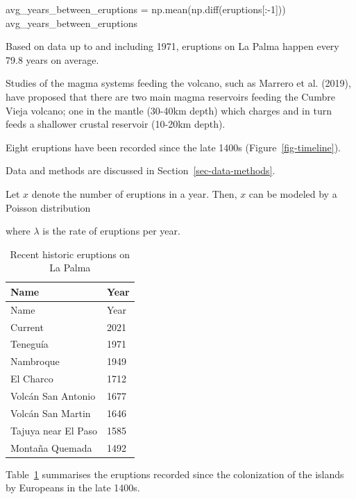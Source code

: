 \documentclass[
  letterpaper,
  DIV=11,
  numbers=noendperiod]{scrreprt}
\newenvironment{Shaded}{\begin{snugshade}}{\end{snugshade}}
\newcommand{\DecValTok}[1]{\textcolor[rgb]{0.68,0.00,0.00}{#1}}
\newcommand{\NormalTok}[1]{\textcolor[rgb]{0.00,0.23,0.31}{#1}}
\newcommand{\OperatorTok}[1]{\textcolor[rgb]{0.37,0.37,0.37}{#1}}
\begin{document}
\begin{Shaded}
\begin{Highlighting}[]
\NormalTok{avg\_years\_between\_eruptions }\OperatorTok{=}\NormalTok{ np.mean(np.diff(eruptions[:}\OperatorTok{{-}}\DecValTok{1}\NormalTok{]))}
\NormalTok{avg\_years\_between\_eruptions}
\end{Highlighting}
\end{Shaded}

Based on data up to and including 1971, eruptions on La Palma happen
every 79.8 years on average.

Studies of the magma systems feeding the volcano, such as Marrero et al.
(2019), have proposed that there are two main magma reservoirs feeding
the Cumbre Vieja volcano; one in the mantle (30-40km depth) which
charges and in turn feeds a shallower crustal reservoir (10-20km depth).

Eight eruptions have been recorded since the late 1400s
(Figure~\ref{fig-timeline}).

Data and methods are discussed in Section~\ref{sec-data-methods}.

Let \(x\) denote the number of eruptions in a year. Then, \(x\) can be
modeled by a Poisson distribution

where \(\lambda\) is the rate of eruptions per year.

\begin{longtable}[]{@{}ll@{}}
\caption{Recent historic eruptions on La
Palma}\label{tbl-history}\tabularnewline
\toprule\noalign{}
Name & Year \\
\midrule\noalign{}
\endfirsthead
\toprule\noalign{}
Name & Year \\
\midrule\noalign{}
\endhead
\bottomrule\noalign{}
\endlastfoot
Current & 2021 \\
Teneguía & 1971 \\
Nambroque & 1949 \\
El Charco & 1712 \\
Volcán San Antonio & 1677 \\
Volcán San Martin & 1646 \\
Tajuya near El Paso & 1585 \\
Montaña Quemada & 1492 \\
\end{longtable}

Table~\ref{tbl-history} summarises the eruptions recorded since the
colonization of the islands by Europeans in the late 1400s.
\end{document}
